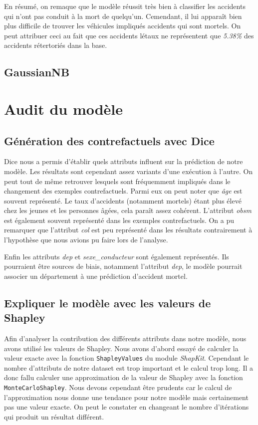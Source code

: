 \documentclass{article}
\begin{document}
    En résumé, on remaque que le modèle réussit très bien à classifier les accidents qui n'ont pas conduit à la mort de quelqu'un. Cemendant,
    il lui apparaît bien plus difficile de trouver les véhicules impliqués accidents qui sont mortels. On peut attribuer ceci au fait que
    ces accidents létaux ne représentent que \textit{5.38\%} des accidents rétertoriés dans la base.
    
    \subsection{GaussianNB}


    \section{Audit du modèle}

    \subsection{Génération des contrefactuels avec Dice}
    Dice nous a permis d'établir quels attributs influent sur la prédiction de notre modèle. Les résultats sont 
    cependant assez variants d'une exécution à l'autre. On peut tout de même retrouver lesquels sont fréquemment impliqués 
    dans le changement des exemples contrefactuels.
    Parmi eux on peut noter que \textit{âge} est souvent représenté. Le taux d'accidents (notamment mortels) étant plus 
    élevé chez les jeunes et les personnes âgées, cela paraît assez cohérent. L'attribut \textit{obsm} est également 
    souvent représenté dans les exemples contrefactuels.
    On a pu remarquer que l'attribut \textit{col} est peu représenté dans les résultats contrairement à l'hypothèse que 
    nous avions pu faire lors de l'analyse.
    
    Enfin les attributs \textit{dep} et \textit{sexe\_conducteur} sont également représentés. Ils pourraient être sources de biais, notamment 
    l'attribut \textit{dep}, le modèle pourrait associer un département à une prédiction d'accident mortel.


    \subsection{Expliquer le modèle avec les valeurs de Shapley}
    Afin d'analyser la contribution des différents attributs dans notre modèle, nous avons 
    utilisé les valeurs de Shapley. Nous avons d'abord essayé de calculer la valeur exacte avec la fonction 
    \verb|ShapleyValues| du module \textit{ShapKit}. Cependant le nombre d'attributs de notre dataset est trop 
    important et le calcul trop long.
    Il a donc fallu calculer une approximation de la valeur de Shapley avec la fonction \verb|MonteCarloShapley|.
    Nous devons cependant être prudents car le calcul de l'approximation nous 
    donne une tendance pour notre modèle mais certainement pas une valeur exacte. On peut le constater en changeant 
    le nombre d'itérations qui produit un résultat différent.
\end{document}
